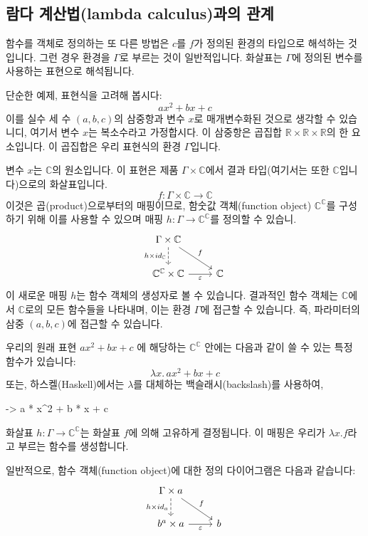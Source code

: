 \documentclass[DaoFP]{subfiles}
\begin{document}
\subsection{람다 계산법(lambda calculus)과의 관계}

함수를 객체로 정의하는 또 다른 방법은 $c$를 $f$가 정의된 환경의 타입으로 해석하는 것입니다. 그런 경우 환경을 $\Gamma$로 부르는 것이 일반적입니다. 화살표는 $\Gamma$에 정의된 변수를 사용하는 표현으로 해석됩니다.

단순한 예제, 표현식을 고려해 봅시다:
\[a x^2 + b x + c\]
이를 실수 세 수 $(a, b, c)$의 삼중항과 변수 $x$로 매개변수화된 것으로 생각할 수 있습니디, 여기서 변수 $x$는 복소수라고 가정합시다. 이 삼중항은 곱집합 $\mathbb{R} \times \mathbb{R} \times \mathbb{R}$의 한 요소입니다. 이 곱집합은 우리 표현식의 환경 $\Gamma$입니다.

변수 $x$는 $\mathbb{C}$의 원소입니다. 이 표현은 제품 $\Gamma \times \mathbb{C}$에서 결과 타입(여기서는 또한 $\mathbb{C}$입니다)으로의 화살표입니다.
\[f \colon \Gamma \times \mathbb{C} \to \mathbb{C} \]
이것은 곱(product)으로부터의 매핑이므로, 함숫값 객체(function object) $\mathbb{C}^{\mathbb{C}}$를 구성하기 위해 이를 사용할 수 있으며 매핑 $h \colon \Gamma \to \mathbb{C}^{\mathbb{C}}$를 정의할 수 있습니.
\[
 \begin{tikzcd}
 \Gamma \times \mathbb{C}
 \arrow[d, dashed, "h \times id_{\mathbb{C}}"']
 \arrow[rd, "f"]
 \\
 \mathbb{C}^{\mathbb{C}} \times \mathbb{C}
 \arrow[r, "\varepsilon"']
& \mathbb{C}
 \end{tikzcd}
\]
이 새로운 매핑 $h$는 함수 객체의 생성자로 볼 수 있습니다. 결과적인 함수 객체는 $\mathbb{C}$에서 $\mathbb{C}$로의 모든 함수들을 나타내며, 이는 환경 $\Gamma$에 접근할 수 있습니다. 즉, 파라미터의 삼중 $(a, b, c)$에 접근할 수 있습니다.

우리의 원래 표현 $a x^2 + b x + c$ 에 해당하는 $\mathbb{C}^{\mathbb{C}}$ 안에는 다음과 같이 쓸 수 있는 특정 함수가 있습니다:
\[  \lambda x . \,a x^2 + b x + c \]
또는, 하스켈(Haskell)에서는 $\lambda$를 대체하는 백슬래시(backslash)를 사용하여,
\begin{haskell}
\x -> a * x^2 + b * x + c
\end{haskell}

화살표 $h \colon \Gamma \to \mathbb{C}^{\mathbb{C}}$는 화살표 $f$에 의해 고유하게 결정됩니다. 이 매핑은 우리가 $\lambda x . f$라고 부르는 함수를 생성합니다.

일반적으로, 함수 객체(function object)에 대한 정의 다이어그램은 다음과 같습니다:
\[
 \begin{tikzcd}
 \Gamma \times a
 \arrow[d, dashed, "{h \times id_a}"']
 \arrow[rd, "f"]
 \\
 b^a \times a
 \arrow[r, "\varepsilon"']
& b
 \end{tikzcd}
\]
\end{document}
